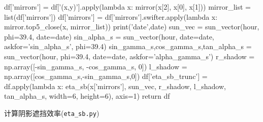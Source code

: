 \documentclass{article}
\numberwithin{equation}{subsection}
\begin{document}
\begin{python}
    df['mirrors'] = df['(x,y)'].apply(lambda x: mirror(x[2], x[0], x[1]))
    mirror_list = list(df['mirrors'])
    df['mirrors'] = df['mirrors'].swifter.apply(lambda x: mirror.top5_close(x, mirror_list))
    print('date',date)
    sun_vec = sun_vector(hour, phi=39.4, date=date)
    sin_alpha_s = sun_vector(hour, date=date, askfor='sin_alpha_s', phi=39.4)
    sin_gamma_s,cos_gamma_s,tan_alpha_s = sun_vector(hour, phi=39.4, date=date, askfor='alpha_gamma_s')
    r_shadow = np.array([-sin_gamma_s, -cos_gamma_s, 0])
    l_shadow = np.array([cos_gamma_s,-sin_gamma_s,0])
    df['eta_sb_trunc'] = df.apply(lambda x: eta_sb(x['mirrors'], sun_vec, r_shadow, l_shadow, tan_alpha_s, width=6, height=6), axis=1)
    return df


\end{python}

计算阴影遮挡效率(\verb|eta_sb.py|)
\end{document}
